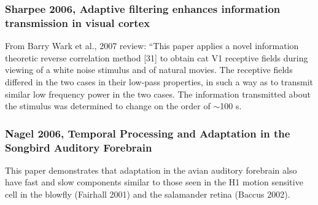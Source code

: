 \documentclass{article}
\begin{document}
\subsubsection{Sharpee 2006, Adaptive filtering enhances information transmission in visual cortex}
From Barry Wark et al., 2007 review: ``This paper applies a novel information theoretic reverse correlation method [31] to obtain cat V1 receptive fields during viewing of a white noise stimulus and of natural movies. The receptive fields differed in the two cases in their low-pass properties, in such a way as to transmit similar low frequency power in the two cases. The information transmitted about the stimulus was determined to change on the order of $\sim$100 s.

\subsubsection{Nagel 2006, Temporal Processing and Adaptation in the Songbird Auditory Forebrain}
This paper demonstrates that adaptation in the avian auditory forebrain also have fast and slow components similar to those seen in the H1 motion sensitive cell in the blowfly (Fairhall 2001) and the salamander retina (Baccus 2002).
\end{document}
